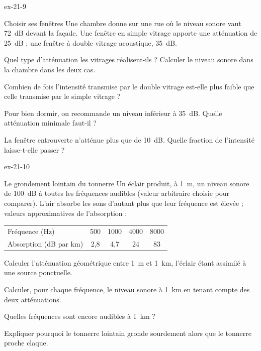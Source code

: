 \begin{blocLivre}{ex-21-9}
\begin{exercice}[2]{Choisir ses fenêtres}
Une chambre donne sur une rue où le niveau sonore vaut \qty{72}{dB} devant la façade. Une fenêtre en simple vitrage
apporte une atténuation de \qty{25}{dB} ; une fenêtre à double vitrage acoustique, \qty{35}{dB}.
\begin{questions}
\item Quel type d'atténuation les vitrages réalisent-ils ? Calculer le niveau sonore dans la chambre dans les deux cas.
\item Combien de fois l'intensité transmise par le double vitrage est-elle plus faible que celle transmise par le simple
vitrage ?
\item Pour bien dormir, on recommande un niveau inférieur à \qty{35}{dB}. Quelle atténuation minimale faut-il ?
\item La fenêtre entrouverte n'atténue plus que de \qty{10}{dB}. Quelle fraction de l'intensité laisse-t-elle passer ?
\end{questions}
\end{exercice}
\end{blocLivre}
\begin{blocLivre}{ex-21-10}
\begin{exercice}[2]{Le grondement lointain du tonnerre}
Un éclair produit, à \qty{1}{m}, un niveau sonore de \qty{100}{dB} à toutes les fréquences audibles (valeur arbitraire
choisie pour comparer). L'air absorbe les sons d'autant plus que leur fréquence est élevée ; valeurs approximatives de
l'absorption :
\begin{center}
\begin{tabular}{lcccc}
\toprule
Fréquence (Hz) & 500 & \num{1000} & \num{4000} & \num{8000} \\
Absorption (dB par km) & 2,8 & 4,7 & 24 & 83 \\
\bottomrule
\end{tabular}
\end{center}
\begin{questions}
\item Calculer l'atténuation géométrique entre \qty{1}{m} et \qty{1}{km}, l'éclair étant assimilé à une source ponctuelle.
\item Calculer, pour chaque fréquence, le niveau sonore à \qty{1}{km} en tenant compte des deux atténuations.
\item Quelles fréquences sont encore audibles à \qty{1}{km} ?
\item Expliquer pourquoi le tonnerre lointain gronde sourdement alors que le tonnerre proche claque.
\end{questions}
\end{exercice}
\end{blocLivre}
